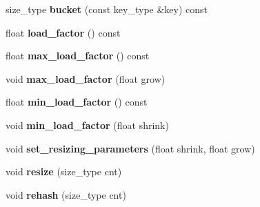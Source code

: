 \begin{DoxyCompactItemize}
\item 
size\+\_\+type {\bfseries bucket} (const key\+\_\+type \&key) const \hypertarget{classspp___1_1sparse__hash__set_a9d31ba4b0489a5a5cbfb9d909bc39a7c}{}\label{classspp___1_1sparse__hash__set_a9d31ba4b0489a5a5cbfb9d909bc39a7c}

\item 
float {\bfseries load\+\_\+factor} () const \hypertarget{classspp___1_1sparse__hash__set_ad6cbcd822fad417e09ad4ddbf25d1e9f}{}\label{classspp___1_1sparse__hash__set_ad6cbcd822fad417e09ad4ddbf25d1e9f}

\item 
float {\bfseries max\+\_\+load\+\_\+factor} () const \hypertarget{classspp___1_1sparse__hash__set_aaead955ac2fce16b063fa8e6ff1ea007}{}\label{classspp___1_1sparse__hash__set_aaead955ac2fce16b063fa8e6ff1ea007}

\item 
void {\bfseries max\+\_\+load\+\_\+factor} (float grow)\hypertarget{classspp___1_1sparse__hash__set_a79b5f2c3232437e9de624b7298f9bd7a}{}\label{classspp___1_1sparse__hash__set_a79b5f2c3232437e9de624b7298f9bd7a}

\item 
float {\bfseries min\+\_\+load\+\_\+factor} () const \hypertarget{classspp___1_1sparse__hash__set_a24a8d05f86c82258181afaeb8ac8201d}{}\label{classspp___1_1sparse__hash__set_a24a8d05f86c82258181afaeb8ac8201d}

\item 
void {\bfseries min\+\_\+load\+\_\+factor} (float shrink)\hypertarget{classspp___1_1sparse__hash__set_ae878b615d5f7184b2e389ba9d2177930}{}\label{classspp___1_1sparse__hash__set_ae878b615d5f7184b2e389ba9d2177930}

\item 
void {\bfseries set\+\_\+resizing\+\_\+parameters} (float shrink, float grow)\hypertarget{classspp___1_1sparse__hash__set_ae62e1045c8066c387c57bd98d9858734}{}\label{classspp___1_1sparse__hash__set_ae62e1045c8066c387c57bd98d9858734}

\item 
void {\bfseries resize} (size\+\_\+type cnt)\hypertarget{classspp___1_1sparse__hash__set_a3dd1bfe81cbd088074bf5279dcebf48b}{}\label{classspp___1_1sparse__hash__set_a3dd1bfe81cbd088074bf5279dcebf48b}

\item 
void {\bfseries rehash} (size\+\_\+type cnt)\hypertarget{classspp___1_1sparse__hash__set_a905e80552e60800b48135c354f1e77f0}{}\label{classspp___1_1sparse__hash__set_a905e80552e60800b48135c354f1e77f0}


\end{DoxyCompactItemize}
